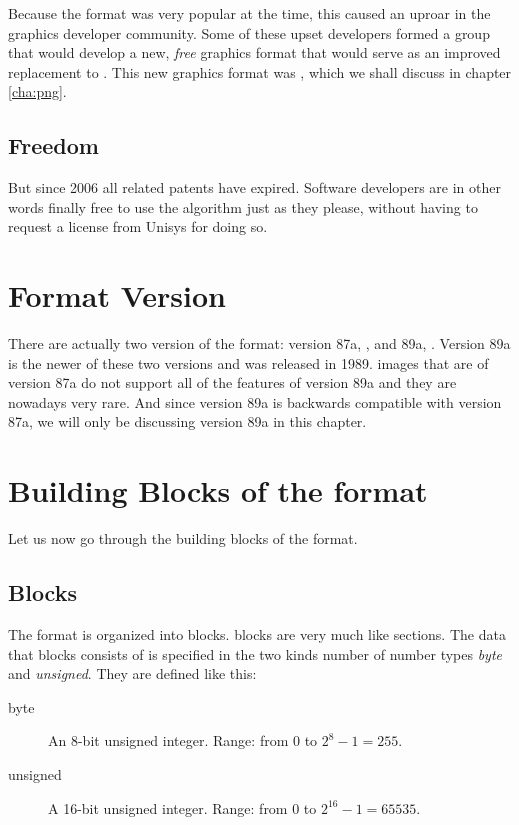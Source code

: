Because the \gif format was very popular at the time, this caused an
uproar in the graphics developer community. Some of these upset
developers formed a group that would develop a new, \textit{free}
graphics format that would serve as an improved replacement to
\gif. This new graphics format was \png, which we shall discuss in
chapter \ref{cha:png}.

\subsection{Freedom}

But since 2006 all \lzw related patents have expired. Software
developers are in other words finally free to use the \lzw algorithm
just as they please, without having to request a license from Unisys
for doing so.

\section{Format Version}

There are actually two version of the \gif format: version 87a,
\cite{gif87a}, and 89a, \cite{gif89a}. Version 89a is the newer of
these two versions and was released in 1989. \gif images that are of
version 87a do not support all of the features of version 89a and they
are nowadays very rare. And since version 89a is backwards compatible
with version 87a, we will only be discussing version 89a in this
chapter.

\section{Building Blocks of the format}

Let us now go through the building blocks of the \gif format.

\subsection{Blocks}

The \gif format is organized into blocks. \gif blocks are very much like
\tga sections. The data that blocks consists of is specified in the two
kinds number of number types \textit{byte} and \textit{unsigned}. They
are defined like this:

\begin{description}
\item[byte] An 8-bit unsigned integer. Range: from 0 to $2^8 - 1 = 255$.
\item[unsigned] A 16-bit unsigned integer. Range: from 0 to $2^{16} -
  1 = 65535$.
\end{description}

